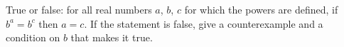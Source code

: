 True or false: for all real numbers $a$, $b$, $c$ for which the powers are defined, if $b^a=b^c$ then $a=c$. If the statement is false, give a counterexample and a condition on $b$ that makes it true.
